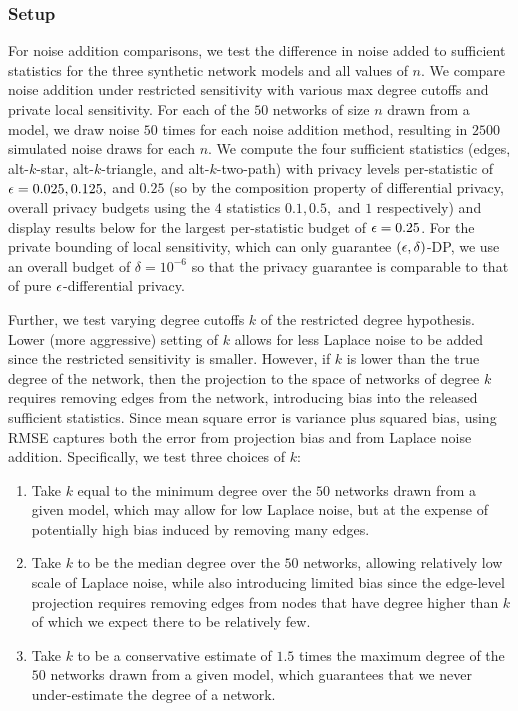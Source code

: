  \subsubsection{Setup}
 For noise addition comparisons, we test the difference in noise added to sufficient statistics for the three synthetic network models and all values of $n$. We compare noise addition under restricted sensitivity with various max degree cutoffs and private local sensitivity. For each of the $50$ networks of size $n$ drawn from a model, we draw noise $50$ times for each noise addition method, resulting in $2500$ simulated noise draws for each $n$. We compute the four sufficient statistics (edges, alt-$k$-star, alt-$k$-triangle, and alt-$k$-two-path) with privacy levels per-statistic of $\epsilon = 0.025, 0.125,$ and $0.25$ (so by the composition property of differential privacy, overall privacy budgets using the $4$ statistics $0.1, 0.5,$ and $1$ respectively) and display results below for the largest per-statistic budget of $\epsilon = 0.25$. For the private bounding of local sensitivity, which can only guarantee $(\epsilon, \delta)$-DP, we use an overall budget of $\delta = 10^{-6}$ so that the privacy guarantee is comparable to that of pure $\epsilon$-differential privacy. 
 
 Further, we test varying degree cutoffs $k$ of the restricted degree hypothesis. Lower (more aggressive) setting of $k$ allows for less Laplace noise to be added since the restricted sensitivity is smaller. However, if $k$ is lower than the true degree of the network, then the projection to the space of networks of degree $k$ requires removing edges from the network, introducing bias into the released sufficient statistics.  Since mean square error is variance plus squared bias, using RMSE captures both the error from projection bias and from Laplace noise addition. Specifically, we test three choices of $k$:
 \vspace{-0.2in}
\begin{enumerate}
	\item Take $k$ equal to the minimum degree over the $50$ networks drawn from a given model, which may allow for low Laplace noise, but at the expense of potentially high bias induced by removing many edges.
	\item Take $k$ to be the median degree over the $50$ networks, allowing relatively low scale of Laplace noise, while also introducing limited bias since the edge-level projection  requires removing edges from nodes that have degree higher than $k$ of which we expect there to be relatively few.
	\item Take $k$ to be a conservative estimate of $1.5$ times the maximum degree of the $50$ networks drawn from a given model, which guarantees that we never under-estimate the degree of a network. 
\end{enumerate}

